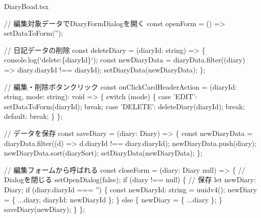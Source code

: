 \begin{starterprogram}[]{DiaryBoad.tsx}
{    // 編集対象データでDiaryFormDialogを開く
    const openForm = () =\textgreater{} setDataToForm('');

    // 日記データの削除
    const deleteDiary = (diaryId: string) =\textgreater{} \{
      console.log(`delete:\textdollar{}\{diaryId\}`);
      const newDiaryData = diaryData.filter((diary) =\textgreater{} diary.diaryId !== diaryId);
      setDiaryData(newDiaryData);
    \};

    // 編集・削除ボタンクリック
    const onClickCardHeaderAction = (diaryId: string, mode: string): void =\textgreater{} \{
      switch (mode) \{
        case 'EDIT':
          setDataToForm(diaryId);
          break;
        case 'DELETE':
          deleteDiary(diaryId);
          break;
        default:
          break;
      \}
    \};

    // データを保存
    const saveDiary = (diary: Diary) =\textgreater{} \{
      const newDiaryData = diaryData.filter((d) =\textgreater{} d.diaryId !== diary.diaryId);
      newDiaryData.push(diary);
      newDiaryData.sort(diarySort);
      setDiaryData(newDiaryData);
    \};

    // 編集フォームから呼ばれる
    const closeForm = (diary: Diary \textbar{} null) =\textgreater{} \{
      // Dialogを閉じる
      setOpenDialog(false);
      if (diary !== null) \{
        // 保存
        let newDiary: Diary;
        if (diary.diaryId === '') \{
          const newDiaryId: string = uuidv4();
          newDiary = \{ ...diary, diaryId: newDiaryId \};
        \} else \{
          newDiary = \{ ...diary \};
        \}
        saveDiary(newDiary);
      \}
    \};

}
\end{starterprogram}
